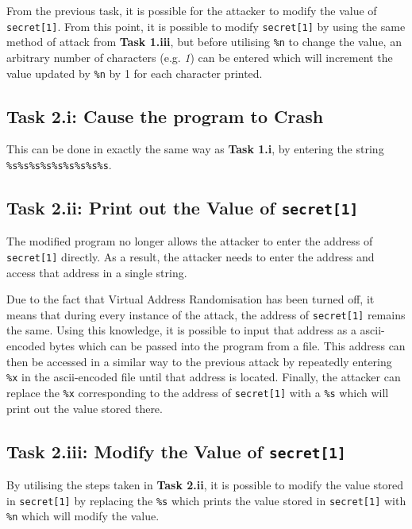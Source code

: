 \documentclass[11pt]{article}
\begin{document}
From the previous task, it is possible for the attacker to modify the
value of \texttt{secret[1]}. From this point, it is possible to modify
\texttt{secret[1]} by using the same method of attack from \textbf{Task 1.iii}, but
before utilising \texttt{\%n} to change the value, an arbitrary number of
characters (e.g. \emph{1}) can be entered which will increment the value
updated by \texttt{\%n} by 1 for each character printed.

\subsection{Task 2.i: Cause the program to Crash}
\label{sec:org76e8d41}

This can be done in exactly the same way as \textbf{Task 1.i}, by entering
the string \texttt{\%s\%s\%s\%s\%s\%s\%s\%s\%s}.


\subsection{Task 2.ii: Print out the Value of \texttt{secret[1]}}
\label{sec:org4c681ae}

The modified program no longer allows the attacker to enter the
address of \texttt{secret[1]} directly. As a result, the attacker needs to
enter the address and access that address in a single string.

Due to the fact that Virtual Address Randomisation has been turned
off, it means that during every instance of the attack, the address of
\texttt{secret[1]} remains the same. Using this knowledge, it is possible to
input that address as a ascii-encoded bytes which can be passed into
the program from a file. This address can then be accessed in a
similar way to the previous attack by repeatedly entering \texttt{\%x} in the
ascii-encoded file until that address is located. Finally, the
attacker can replace the \texttt{\%x} corresponding to the address of
\texttt{secret[1]} with a \texttt{\%s} which will print out the value stored there.


\subsection{Task 2.iii: Modify the Value of \texttt{secret[1]}}
\label{sec:org5c874f2}

By utilising the steps taken in \textbf{Task 2.ii}, it is possible to modify
the value stored in \texttt{secret[1]} by replacing the \texttt{\%s} which prints the
value stored in \texttt{secret[1]} with \texttt{\%n} which will modify the value.
\end{document}

